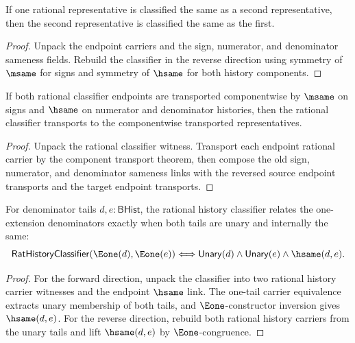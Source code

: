 \begin{theorem}
\label{thm:rat-classifier-symmetry}
If one rational representative is classified the same as a second representative,
then the second representative is classified the same as the first.
\end{theorem}
\begin{proof}
Unpack the endpoint carriers and the sign, numerator, and denominator sameness
fields. Rebuild the classifier in the reverse direction using symmetry of
$\msame$ for signs and symmetry of $\hsame$ for both history components.
\end{proof}

\begin{theorem}
\label{thm:rat-classifier-component-transport}
If both rational classifier endpoints are transported componentwise by
$\msame$ on signs and $\hsame$ on numerator and denominator histories,
then the rational classifier transports to the componentwise transported
representatives.
\end{theorem}
\begin{proof}
Unpack the rational classifier witness. Transport each endpoint rational
carrier by the component transport theorem, then compose the old sign,
numerator, and denominator sameness links with the reversed source endpoint
transports and the target endpoint transports.
\end{proof}

\begin{theorem}
\label{thm:rat-history-classifier-e1-tail-unary-iff}
For denominator tails $d,e:\mathsf{BHist}$, the rational history classifier
relates the one-extension denominators exactly when both tails are unary and
internally the same:
$$
\mathsf{RatHistoryClassifier}(\Eone(d),\Eone(e))
\Longleftrightarrow
\mathsf{Unary}(d)\land \mathsf{Unary}(e)\land \hsame(d,e).
$$
\end{theorem}
\begin{proof}
For the forward direction, unpack the classifier into two rational history
carrier witnesses and the endpoint $\hsame$ link. The one-tail carrier
equivalence extracts unary membership of both tails, and $\Eone$-constructor
inversion gives $\hsame(d,e)$. For the reverse direction, rebuild both
rational history carriers from the unary tails and lift $\hsame(d,e)$ by
$\Eone$-congruence.
\end{proof}

